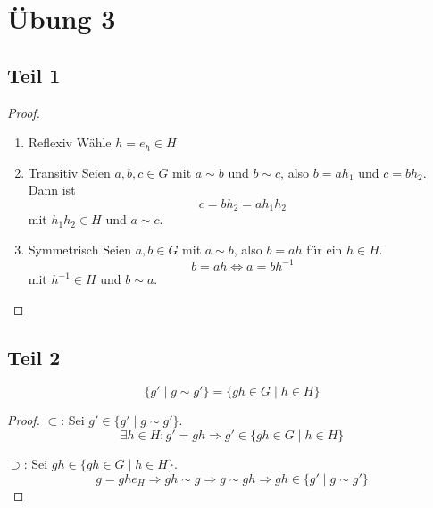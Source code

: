 \documentclass[10pt,a4paper]{article}
\begin{document}
\section{Übung 3}

\subsection{Teil 1}

\begin{proof}
  \begin{enumerate}
    \item{Reflexiv} Wähle $h = e_{h} \in H$
    \item{Transitiv} Seien $a, b, c \in G$ mit $a \sim b$ und $b \sim c$, also $b = ah_{1}$ und $c = bh_{2}$.
      Dann ist
      \begin{equation}
        c = bh_{2} = ah_{1}h_{2}
      \end{equation}
      mit $h_{1}h_{2} \in H$ und $a \sim c$.
    \item{Symmetrisch} Seien $a, b \in G$ mit $a \sim b$, also $b = ah$ für ein $h \in H$.
      \begin{equation}
        b = ah \Leftrightarrow a = bh^{-1}
      \end{equation}
      mit $h^{-1} \in H$ und $b \sim a$.
  \end{enumerate}
\end{proof}

\subsection{Teil 2}

\begin{equation}
  \{ g' \mid g \sim g' \} = \{ gh \in G \mid h \in H \}
\end{equation}

\begin{proof}
  $\subset$:
  Sei $g' \in \{ g' \mid g \sim g' \}$.
  \begin{equation}
    \exists h \in H : g' = gh \Rightarrow g' \in \{ gh \in G \mid h \in H \}
  \end{equation}

  $\supset$:
  Sei $gh \in \{ gh \in G \mid h \in H \}$.
  \begin{equation}
    g = ghe_{H} \Rightarrow gh \sim g \Rightarrow g \sim gh \Rightarrow gh \in \{ g' \mid g \sim g' \}
  \end{equation}
\end{proof}
\end{document}
